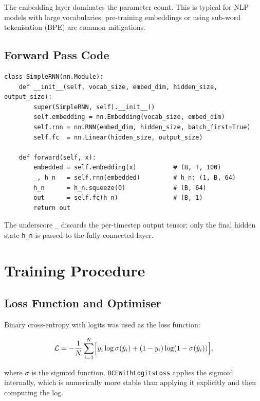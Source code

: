 \documentclass[12pt,a4paper]{article}
\begin{document}
The embedding layer dominates the parameter count.  This is typical
for NLP models with large vocabularies; pre-training embeddings or
using sub-word tokenisation (BPE) are common mitigations.

\subsection{Forward Pass Code}
\label{subsec:forward_pass}

\begin{verbatim}
class SimpleRNN(nn.Module):
    def __init__(self, vocab_size, embed_dim, hidden_size, output_size):
        super(SimpleRNN, self).__init__()
        self.embedding = nn.Embedding(vocab_size, embed_dim)
        self.rnn = nn.RNN(embed_dim, hidden_size, batch_first=True)
        self.fc  = nn.Linear(hidden_size, output_size)

    def forward(self, x):
        embedded = self.embedding(x)          # (B, T, 100)
        _, h_n   = self.rnn(embedded)         # h_n: (1, B, 64)
        h_n      = h_n.squeeze(0)             # (B, 64)
        out      = self.fc(h_n)               # (B, 1)
        return out
\end{verbatim}

The underscore \texttt{\_} discards the per-timestep output tensor;
only the final hidden state \texttt{h\_n} is passed to the
fully-connected layer.

\section{Training Procedure}
\label{sec:training}

\subsection{Loss Function and Optimiser}
\label{subsec:loss_optimiser}

Binary cross-entropy with logits was used as the loss function:

\begin{equation}
  \mathcal{L} = -\frac{1}{N}\sum_{i=1}^{N}
    \Bigl[ y_i \log \sigma(\hat{y}_i)
         + (1 - y_i) \log (1 - \sigma(\hat{y}_i)) \Bigr],
  \label{eq:bce_loss}
\end{equation}

where $\sigma$ is the sigmoid function.  \texttt{BCEWithLogitsLoss}
applies the sigmoid internally, which is numerically more stable than
applying it explicitly and then computing the log.
\end{document}
